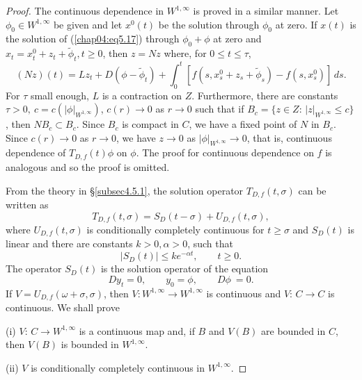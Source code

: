 \documentclass{surv-l}
\theoremstyle{plain}
\theoremstyle{definition}
\numberwithin{equation}{section}
\numberwithin{figure}{chapter}
\begin{document}
\begin{proof}
The continuous dependence in $W^{1,\infty}$ is proved in a similar manner. Let $\phi_{0}\in W^{1,\infty}$ be given and let $x^{0}(t)$ be the solution through $\phi_{0}$ at zero. If $x(t)$ is the solution of (\ref{chap04:eq5.17}) through $\phi_{0}+\phi$ at zero and $x_{t}=x_{t}^{0}+z_{t}+\tilde{\phi}_{t}, t\geq 0$, then $z=Nz$ where, for $0\leq t\leq\tau$,
\begin{equation*}
(Nz)(t)=Lz_{t}+D(\phi-\tilde{\phi}_{t})+\int_{0}^{t}[f(s, x_{s}^{0}+z_{s}+\tilde{\phi}_{s})-f(s, x_{s}^{0})]\,ds.
\end{equation*}
For $\tau$ small enough, $L$ is a contraction on $Z$. Furthermore, there are constants $\tau>0,\ c=c(|\phi|_{W^{1,\infty}})$, $c(r)\rightarrow 0$ as $r\rightarrow 0$ such that if $B_{c}=\{z\in Z:\,|z|_{W^{1,\infty}}\leq c\}$, then $NB_{c}\subset B_{c}$. Since $B_{c}$ is compact in $C$, we have a fixed point of $N$ in $B_{c}$. Since $c(r)\rightarrow 0$ as $r\rightarrow 0$, we have $z\rightarrow 0$ as $|\phi|_{W^{1,\infty}}\rightarrow 0$, that is, continuous dependence of $T_{D,f}(t)\phi$ on $\phi$. The proof for continuous dependence on $f$ is analogous and so the proof is omitted.

From the theory in \S \ref{subsec4.5.1}, the solution operator $T_{D,f}(t, \sigma)$ can be written as
\begin{equation}\label{chap04:eq5.18}
T_{D,f}(t, \sigma)=S_{D}(t-\sigma)+U_{D,f}(t, \sigma),
\end{equation}
where $U_{D,f}(t, \sigma)$ is conditionally completely continuous for $t\geq\sigma$ and $S_{D}(t)$ is linear and there are constants $k>0, \alpha>0$, such that
\begin{equation}\label{chap04:eq5.19}
|S_{D}(t)|\leq ke^{-\alpha t},\qquad t\geq 0.
\end{equation}
The operator $S_{D}(t)$ is the solution operator of the equation
\begin{equation*}
Dy_{t}=0,\qquad y_{0}=\phi,\qquad D\phi\ =0.
\end{equation*}
If $V=U_{D,f}(\omega+\sigma, \sigma)$, then $V:W^{1,\infty}\rightarrow W^{1,\infty}$ is continuous and $V:\,C\rightarrow C$ is continuous. We shall prove

(i) $V:\,C\rightarrow W^{1,\infty}$ is a continuous map and, if $B$ and $V(B)$ are bounded in $C$, then $V(B)$ is bounded in $W^{1,\infty}$.

(ii) $V$ is conditionally completely continuous in $W^{1,\infty}$.


\end{proof}
\end{document}
